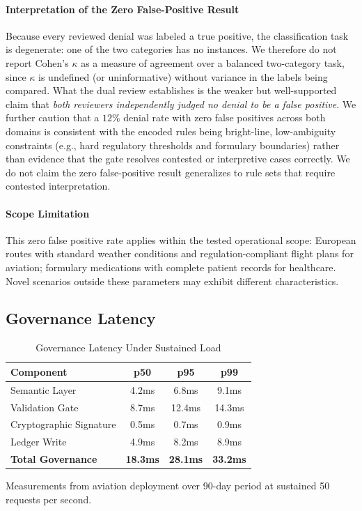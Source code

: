 \documentclass[sigconf,nonacm]{acmart}
\begin{document}
\paragraph{Interpretation of the Zero False-Positive Result} Because every reviewed denial was labeled a true positive, the classification task is degenerate: one of the two categories has no instances. We therefore do not report Cohen's $\kappa$ as a measure of agreement over a balanced two-category task, since $\kappa$ is undefined (or uninformative) without variance in the labels being compared. What the dual review establishes is the weaker but well-supported claim that \emph{both reviewers independently judged no denial to be a false positive}. We further caution that a $12\%$ denial rate with zero false positives across both domains is consistent with the encoded rules being bright-line, low-ambiguity constraints (e.g., hard regulatory thresholds and formulary boundaries) rather than evidence that the gate resolves contested or interpretive cases correctly. We do not claim the zero false-positive result generalizes to rule sets that require contested interpretation.

\paragraph{Scope Limitation} This zero false positive rate applies within the tested operational scope: European routes with standard weather conditions and regulation-compliant flight plans for aviation; formulary medications with complete patient records for healthcare. Novel scenarios outside these parameters may exhibit different characteristics.

\subsection{Governance Latency}

\begin{table}[htbp]
\caption{Governance Latency Under Sustained Load}
\label{tab:latency}
\begin{tabular}{@{}lccc@{}}
\toprule
\textbf{Component} & \textbf{p50} & \textbf{p95} & \textbf{p99} \\
\midrule
Semantic Layer & 4.2ms & 6.8ms & 9.1ms \\
Validation Gate & 8.7ms & 12.4ms & 14.3ms \\
Cryptographic Signature & 0.5ms & 0.7ms & 0.9ms \\
Ledger Write & 4.9ms & 8.2ms & 8.9ms \\
\midrule
\textbf{Total Governance} & \textbf{18.3ms} & \textbf{28.1ms} & \textbf{33.2ms} \\
\bottomrule
\end{tabular}
\medskip
\small
Measurements from aviation deployment over 90-day period at sustained 50 requests per second.
\end{table}
\end{document}
